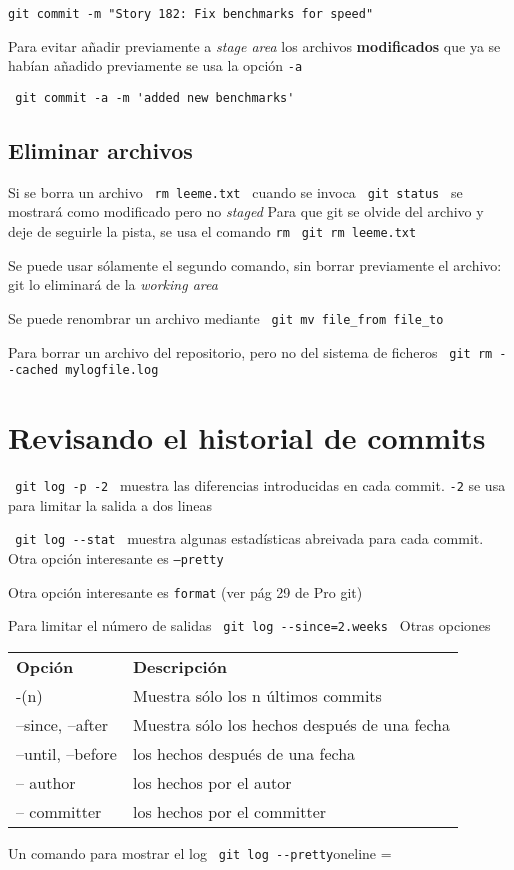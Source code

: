 \documentclass[]{article}
\begin{document}
\verb=git commit -m "Story 182: Fix benchmarks for speed"=


Para evitar añadir previamente a \textit{stage area} los archivos \textbf{modificados} que ya se habían añadido previamente  se usa la opción \texttt{-a} 

\verb= git commit -a -m 'added new benchmarks' =

\subsection*{Eliminar archivos}

Si se borra un archivo \verb= rm leeme.txt = cuando se invoca \verb= git status = se mostrará como modificado pero no \textit{staged} Para que git se olvide del archivo y deje de seguirle la pista, se usa el comando \texttt{rm} \verb= git rm leeme.txt = 

Se puede usar sólamente el segundo comando, sin borrar previamente el archivo: git lo eliminará de la \textit{working area}

Se puede renombrar un archivo mediante \verb= git mv file_from file_to =

Para borrar un archivo del repositorio, pero no del sistema de ficheros \verb= git rm --cached mylogfile.log =

\section{Revisando el historial de commits}

\verb= git log -p -2 = muestra las diferencias introducidas en cada commit. \texttt{-2} se usa para limitar la salida a dos lineas

\verb= git log --stat = muestra algunas estadísticas abreivada para cada commit. Otra opción interesante es \texttt{--pretty}

Otra opción interesante es \texttt{format} (ver pág 29 de Pro git)

Para limitar el número de salidas \verb+ git log --since=2.weeks + Otras opciones

\begin{tabular}{ll}
	\textbf{Opción} & \textbf{Descripción}\\
	-(n) & Muestra sólo los n últimos commits\\
	--since, --after & Muestra sólo los hechos después de una fecha\\
	--until, --before & los hechos después de una fecha\\
	-- author & los hechos por el autor\\
	-- committer & los hechos por el committer\\
\end{tabular}

Un comando para mostrar el log \verb= git log --pretty=oneline =
\end{document}
